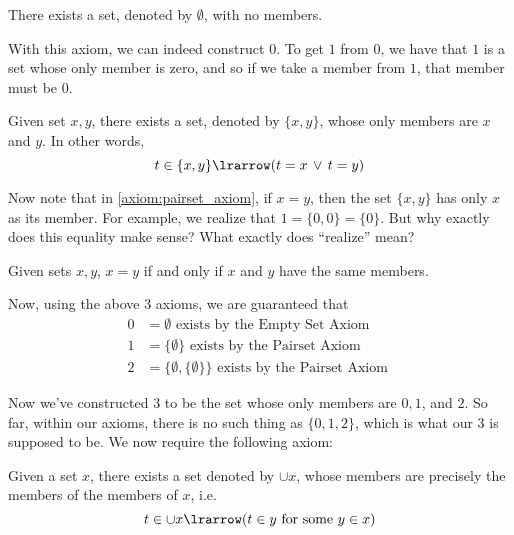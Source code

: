 \documentclass[notoc,notitlepage]{tufte-book}
\begin{document}
\begin{axiom}
\label{axiom:empty_set_axiom}
  There exists a set, denoted by $\emptyset$, with no members.
\end{axiom}

With this axiom, we can indeed construct $0$. To get $1$ from $0$, we have that $1$ is a set whose only member is zero, and so if we take a member from $1$, that member must be $0$.

\begin{axiom}
\label{axiom:pairset_axiom}
  Given set $x, y$, there exists a set, denoted by $\{x , y\}$, whose only members are $x$ and $y$. In other words,
  \begin{equation*}
    t \in \{ x, y \} \lrarrow ( t = x \, \lor \, t = y )
  \end{equation*}
\end{axiom}

Now note that in \cref{axiom:pairset_axiom}, if $x = y$, then the set $\{x, y\}$ has only $x$ as its member. For example, we realize that $1 = \{ 0, 0 \} = \{ 0 \}$. But why exactly does this equality make sense? What exactly does ``realize'' mean?

\begin{axiom}
\label{axiom:axiom_of_extension}
  Given sets $x, y$, $x = y$ if and only if $x$ and $y$ have the same members.
\end{axiom}

Now, using the above 3 axioms, we are guaranteed that
\begin{align*}
  0 &= \emptyset \text{ exists by the Empty Set Axiom } \\
  1 &= \{ \emptyset \} \text{ exists by the Pairset Axiom } \\
  2 &= \{ \emptyset, \{ \emptyset \} \} \text{ exists by the Pairset Axiom }
\end{align*}

Now we've constructed $3$ to be the set whose only members are $0, 1$, and $2$. So far, within our axioms, there is no such thing as $\{0, 1, 2\}$, which is what our $3$ is supposed to be. We now require the following axiom:

\begin{axiom}
\label{axiom:union_set_axiom}
  Given a set $x$, there exists a set denoted by $\cup x$, whose members are precisely the members of the members of $x$, i.e.
  \begin{equation*}
    t \in \cup x \lrarrow ( t \in y \text{ for some } y \in x )
  \end{equation*}
\end{axiom}
\end{document}
